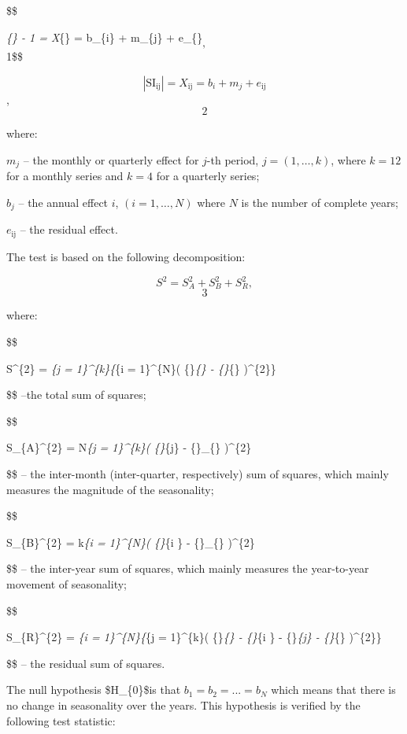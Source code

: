 \documentclass[
  letterpaper,
  DIV=11,
  numbers=noendperiod]{scrreprt}
\begin{document}
\$\$

\left\textbar{}\emph{\{\} - 1 \right\textbar{} =
X}\{\} = b\_\{i\} + m\_\{j\} + e\_\{\} \[, \]1\$\$

\[
  \left| \text{SI}_{\text{ij}} \right| = X_{\text{ij}} = b_{i} + m_{j} + e_{\text{ij}}
  \], \[2\]

where:

\(m_{j}\) -- the monthly or quarterly effect for \(j\)-th period,
\(j = (1,\ldots,k)\), where \(k = 12\) for a monthly series and
\(k = 4\) for a quarterly series;

\(b_{j}\) -- the annual effect \(i\), \((i = 1,\ldots,N)\) where \(N\)
is the number of complete years;

\(e_{\text{ij}}\) -- the residual effect.

The test is based on the following decomposition:

\[S^{2} = S_{A}^{2} + S_{B}^{2} + S_{R}^{2},\] \[3\]

where:

\$\$

S\^{}\{2\} = \sum\emph{\{j = 1\}\^{}\{k\}\{\sum}\{i = 1\}\^{}\{N\}\left(
\{\}\emph{\{\} -
\{\}}\{\bullet \bullet\} \right)\^{}\{2\}\}~

\$\$ --the total sum of squares;

\$\$

S\_\{A\}\^{}\{2\} = N\sum\emph{\{j = 1\}\^{}\{k\}\left(
\{\}}\{\bullet j\} - \{\}\_\{\bullet \bullet\}
\right)\^{}\{2\}

\$\$ -- the inter-month (inter-quarter, respectively) sum of squares,
which mainly measures the magnitude of the seasonality;

\$\$

S\_\{B\}\^{}\{2\} = k\sum\emph{\{i = 1\}\^{}\{N\}\left(
\{\}}\{i \bullet\} - \{\}\_\{\bullet \bullet\}
\right)\^{}\{2\}

\$\$ -- the inter-year sum of squares, which mainly measures the
year-to-year movement of seasonality;

\$\$

S\_\{R\}\^{}\{2\} = \sum\emph{\{i = 1\}\^{}\{N\}\{\sum}\{j =
1\}\^{}\{k\}\left( \{\}\emph{\{\} -
\{\}}\{i \bullet\} - \{\}\emph{\{\bullet j\} -
\{\}}\{\bullet \bullet\} \right)\^{}\{2\}\}

\$\$ -- the residual sum of squares.

The null hypothesis \$H\_\{0\}\$is that \(b_{1} = b_{2} = ... = b_{N}\)
which means that there is no change in seasonality over the years. This
hypothesis is verified by the following test statistic:
\end{document}
